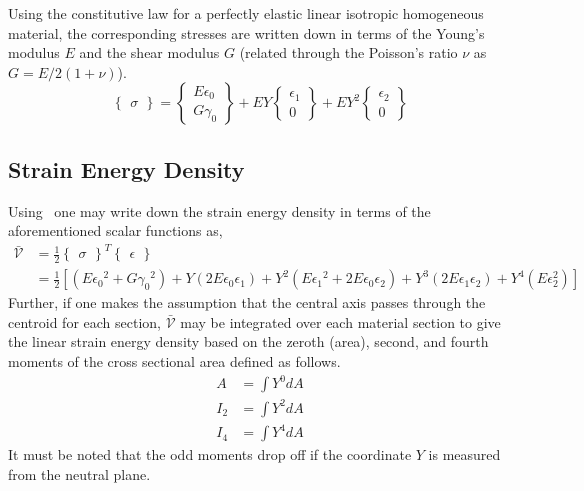 \documentclass[10pt]{article}
\begin{document}
Using the constitutive law for a perfectly elastic linear isotropic
homogeneous material, the corresponding stresses are written down in
terms of the Young's modulus $E$ and the shear modulus $G$ (related
through the Poisson's ratio $\nu$ as $G=E/2(1+\nu)$).
\begin{equation}
  \begin{Bmatrix}\sigma\end{Bmatrix} = \begin{Bmatrix}E\epsilon_0\\G\gamma_0\end{Bmatrix} +
  EY\begin{Bmatrix} \epsilon_1\\0 \end{Bmatrix} + EY^2\begin{Bmatrix}
    \epsilon_2\\0 \end{Bmatrix}
  \label{eq:stress}
\end{equation}

\subsection{Strain Energy Density}
\label{sec:stra-energy-dens}

Using~ one may write down the
strain energy density in terms of the aforementioned scalar functions
as,
\begin{align}
  \bar{\mathcal{V}} &= \frac{1}{2}
                {\begin{Bmatrix}\sigma\end{Bmatrix}}^T \begin{Bmatrix}\epsilon\end{Bmatrix}\nonumber\\
  &= \frac{1}{2}\left[ (E{\epsilon_0}^2 + G{\gamma_0}^2) +
    Y(2E\epsilon_0\epsilon_1) +
    Y^2(E{\epsilon_1}^2+2E\epsilon_0\epsilon_2) +
    Y^3(2E\epsilon_1\epsilon_2) + Y^4(E\epsilon_2^2)\right]
  \label{eq:sedens}
\end{align}
Further, if one makes the assumption that the central axis passes
through the centroid for each section, $\bar{\mathcal{V}}$ may be
integrated over each material section to give the linear strain energy
density based on the zeroth (area), second, and  fourth moments of the
cross sectional area defined as follows.
\begin{align}
  A &= \int Y^0 dA\nonumber\\
  I_2 &= \int Y^2 dA\label{eq:armoms}\\
  I_4 &= \int Y^4 dA
\end{align}
It must be noted that the odd moments drop off if the coordinate $Y$
is measured from the neutral plane.
\end{document}
